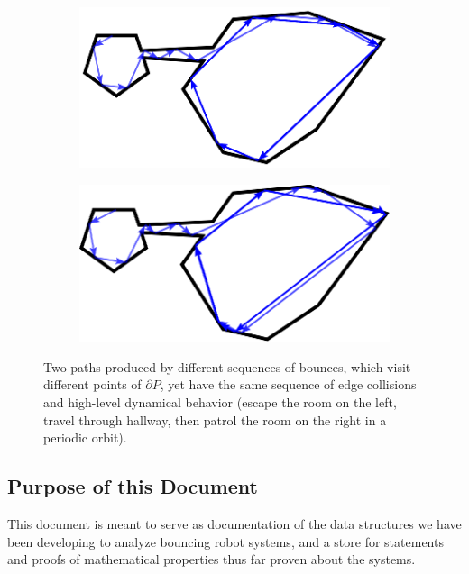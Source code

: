 \documentclass[sageh,times,Review]{sagej}
\begin{document}
\begin{figure}
\centering
\begin{subfigure}{0.5\columnwidth}
\includegraphics[width=\linewidth]{twoc_a_new.eps}
\end{subfigure}%
\begin{subfigure}{0.5\columnwidth}
\includegraphics[width=\linewidth]{twoc_b.eps}
\end{subfigure}
\caption{Two paths produced by different sequences of bounces, which visit
different points of $\partial P$, yet have the same sequence of edge collisions 
and high-level dynamical behavior (escape the room on the left, travel through hallway, then
patrol the room on the right in a periodic orbit).\label{fig:twopaths}}
\end{figure}


\subsection{Purpose of this Document}

This document is meant to serve as documentation of the data structures we have
been developing to analyze bouncing robot systems, and a store for 
statements and proofs of mathematical properties thus far proven about the
systems.
\end{document}
